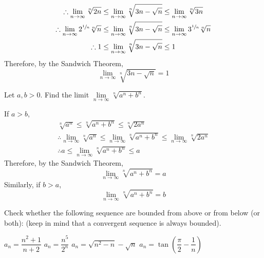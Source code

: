 \documentclass[fleqn, a4paper, 12pt, oneside]{amsart}
\theoremstyle{definition}
\theoremstyle{theorem}
\begin{document}
\begin{solution}
\begin{tasks}
\begin{gather*}
				\therefore \lim\limits_{n \to \infty} \sqrt[n]{2n} \le \lim\limits_{n \to \infty} \sqrt[n]{3n - \sqrt{n}} \le \lim\limits_{n \to \infty} \sqrt[n]{3n}\\
				\therefore \lim\limits_{n \to \infty} 2^{\sfrac{1}{n}} \sqrt[n]{n} \le \lim\limits_{n \to \infty} \sqrt[n]{3n - \sqrt{n}} \le \lim\limits_{n \to \infty} 3^{\sfrac{1}{n}} \sqrt[n]{n}\\
				\therefore 1 \le \lim\limits_{n \to \infty} \sqrt[n]{3n - \sqrt{n}} \le 1
			\end{gather*}
			Therefore, by the Sandwich Theorem,
			\begin{equation*}
				\lim\limits_{n \to \infty} \sqrt[n]{3n - \sqrt{n}} = 1
			\end{equation*}
	\end{tasks}
\end{solution}

\begin{question}
	Let $a,b > 0$. Find the limit $\lim\limits_{n \to \infty} \sqrt[n]{a^n + b^n}$.
\end{question}

\begin{solution}
	If $a > b$,
	\begin{gather*}
		\sqrt[n]{a^n} \le \sqrt[n]{a^n + b^n} \le \sqrt[n]{2a^n}\\
		\therefore \lim\limits_{n \to \infty} \sqrt[n]{a^n} \le \lim\limits_{n \to \infty} \sqrt[n]{a^n + b^n} \le \lim\limits_{n \to \infty} \sqrt[n]{2a^n}\\
		\therefore a \le \lim\limits_{n \to \infty} \sqrt[n]{a^n + b^n} \le a
	\end{gather*}
	Therefore, by the Sandwich Theorem,
	\begin{equation*}
		\lim\limits_{n \to \infty} \sqrt[n]{a^n + b^n} = a
	\end{equation*}
	Similarly, if $b > a$,
	\begin{equation*}
		\lim\limits_{n \to \infty} \sqrt[n]{a^n + b^n} = b
	\end{equation*}
\end{solution}

\begin{question}
	 Check whether the following sequence are bounded from above or from below (or both): (keep in mind that a convergent sequence is always bounded).
	 \begin{tasks}
	 	\task $a_n = \dfrac{n^2 + 1}{n + 2}$
	 	\task $a_n = \dfrac{n^5}{2^n}$
	 	\task $a_n = \sqrt{n^2 - n} - \sqrt{n}$
	 	\task $a_n = \tan \left( \dfrac{\pi}{2} - \dfrac{1}{n} \right)$
	 \end{tasks}
\end{question}
\end{document}
